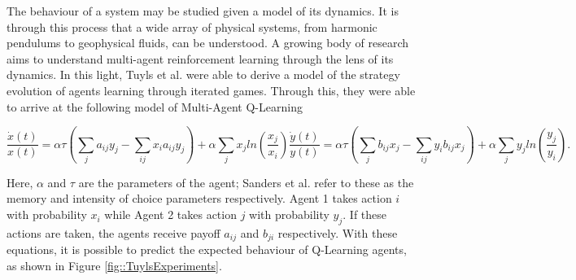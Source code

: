 \documentclass[.../main.tex]{subfiles}
\begin{document}
    The behaviour of a system may be studied given a model of its dynamics. It is through this
    process that a wide array of physical systems, from harmonic pendulums to geophysical fluids,
    can be understood. A growing body of research aims to understand multi-agent reinforcement
    learning through the lens of its dynamics. In this light, Tuyls et al. \cite{Tuyls2006AnGames}
    were able to derive a model of the strategy evolution of agents learning through iterated games.
    Through this, they were able to arrive at the following model of Multi-Agent Q-Learning

	\begin{subequations}
	\label{eqn::EOM}
		\begin{equation}
			\frac{\dot{x}(t)}{x(t)} = \alpha \tau (\sum_{j} a_{ij} y_j - \sum_{i j} x_i a_{ij} y_j)
			+ \alpha \sum_j x_j ln(\frac{x_j}{x_i}) 
		\end{equation}
		\begin{equation}
			\frac{\dot{y}(t)}{y(t)} = \alpha \tau (\sum_{j} b_{ij} x_j - \sum_{i j} y_i b_{ij} x_j)
			+ \alpha \sum_j y_j ln(\frac{y_j}{y_i}).
		\end{equation}
	\end{subequations}

	Here, $\alpha$ and $\tau$ are the parameters of the agent; Sanders et al. refer to these as the
	memory and intensity of choice parameters respectively. Agent 1 takes action $i$ with probability
	$x_i$ while Agent 2 takes action $j$ with probability $y_j$. If these actions are taken, the agents
	receive payoff $a_{ij}$ and $b_{ji}$ respectively. With these equations, it is possible to
	predict the expected behaviour of Q-Learning agents, as shown in Figure 
	\ref{fig::TuylsExperiments}.
\end{document}
